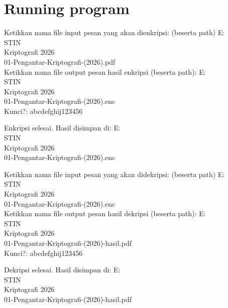 \documentclass{article}
\begin{document}

\section*{Running program}

Ketikkan nama file input pesan yang akan dienkripsi: (beserta path) E:\\STIN\\Kriptografi 2026\\01-Pengantar-Kriptografi-(2026).pdf\\
Ketikkan nama file output pesan hasil enkripsi (beserta path): E:\\STIN\\Kriptografi 2026\\01-Pengantar-Kriptografi-(2026).enc\\
Kunci?: abcdefghij123456

Enkripsi selesai. Hasil disimpan di: E:\\STIN\\Kriptografi 2026\\01-Pengantar-Kriptografi-(2026).enc

Ketikkan nama file input pesan yang akan didekripsi: (beserta path) E:\\STIN\\Kriptografi 2026\\01-Pengantar-Kriptografi-(2026).enc\\
Ketikkan nama file output pesan hasil dekripsi (beserta path): E:\\STIN\\Kriptografi 2026\\01-Pengantar-Kriptografi-(2026)-hasil.pdf\\
Kunci?: abcdefghij123456

Dekripsi selesai. Hasil disimpan di: E:\\STIN\\Kriptografi 2026\\01-Pengantar-Kriptografi-(2026)-hasil.pdf
\end{document}
